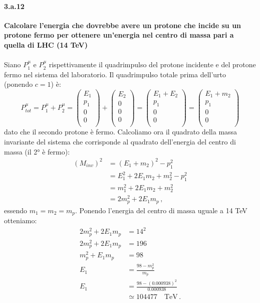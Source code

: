 \documentclass[twoside]{article}
\begin{document}
\paragraph{3.a.12}\textbf{Calcolare l'energia che dovrebbe avere un protone che incide su un protone fermo per ottenere un'energia nel centro di massa pari a quella di LHC (14 TeV)}\\
\\
Siano $P_1^\mu$ e $P_2^\mu$ rispettivamente il quadrimpulso del protone incidente e del protone fermo nel sistema del laboratorio. Il quadrimpulso totale prima dell'urto (ponendo $c=1$) è:
\begin{equation*}
P^{\mu}_{tot}=P_1^\mu+P_2^\mu=
\begin{pmatrix}
E_1 \\
p_1 \\
0 \\
0 \\
\end{pmatrix}
+
\begin{pmatrix}
E_2 \\
0 \\
0 \\
0 \\
\end{pmatrix}
=
\begin{pmatrix}
E_1+E_2 \\
p_1 \\
0 \\
0 \\
\end{pmatrix}
=
\begin{pmatrix}
E_1+m_2 \\
p_1 \\
0 \\
0 \\
\end{pmatrix}
\end{equation*}
dato che il secondo protone è fermo. Calcoliamo ora il quadrato della massa invariante del sistema che corrisponde al quadrato dell'energia del centro di massa (il 2° è fermo):
\begin{align*}
(M_{inv})^2&=(E_1+m_2)^2-p_1^2 \\
&=E_1^2+2E_1m_2+m_2^2-p_1^2 \\
&=m_1^2+2E_1m_2+m_2^2 \\
&=2m_p^2+2E_1m_p \, ,
\end{align*}
essendo $m_1=m_2=m_p$. Ponendo l'energia del centro di massa uguale a 14 TeV otteniamo:
\begin{align*}
2m_p^2+2E_1m_p&=14^2 \\
2m_p^2+2E_1m_p&=196 \\
m_p^2+E_1m_p&=98 \\
E_1&=\frac{98-m_p^2}{m_p} \\
E_1&=\frac{98-(0.000938)^2}{0.000938} \\
&\simeq 104477 \quad \text{TeV} \, .
\end{align*}
\end{document}
